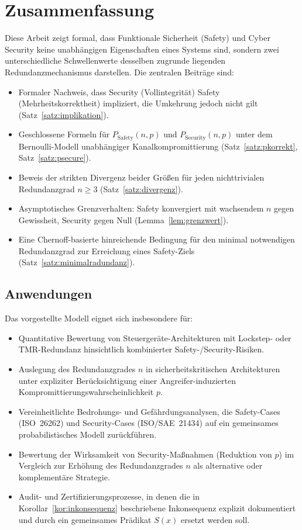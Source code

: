 ﻿\documentclass[a4paper,12pt]{article}
\theoremstyle{definition}
\begin{document}
\section{Zusammenfassung}

Diese Arbeit zeigt formal, dass Funktionale Sicherheit (Safety) und Cyber Security keine unabhängigen Eigenschaften eines Systems sind, sondern zwei unterschiedliche Schwellenwerte desselben zugrunde liegenden Redundanzmechanismus darstellen. Die zentralen Beiträge sind:

\begin{itemize}
	\item Formaler Nachweis, dass Security (Vollintegrität) Safety (Mehrheitskorrektheit) impliziert, die Umkehrung jedoch nicht gilt (Satz~\ref{satz:implikation}).
	\item Geschlossene Formeln für $P_{\mathrm{Safety}}(n,p)$ und $P_{\mathrm{Security}}(n,p)$ unter dem Bernoulli-Modell unabhängiger Kanalkompromittierung (Satz~\ref{satz:pkorrekt}, Satz~\ref{satz:psecure}).
	\item Beweis der strikten Divergenz beider Größen für jeden nichttrivialen Redundanzgrad $n \geq 3$ (Satz~\ref{satz:divergenz}).
	\item Asymptotisches Grenzverhalten: Safety konvergiert mit wachsendem $n$ gegen Gewissheit, Security gegen Null (Lemma~\ref{lem:grenzwert}).
	\item Eine Chernoff-basierte hinreichende Bedingung für den minimal notwendigen Redundanzgrad zur Erreichung eines Safety-Ziels (Satz~\ref{satz:minimalradundanz}).
\end{itemize}

\subsection{Anwendungen}

Das vorgestellte Modell eignet sich insbesondere für:
\begin{itemize}
	\item Quantitative Bewertung von Steuergeräte-Architekturen mit Lockstep- oder TMR-Redundanz hinsichtlich kombinierter Safety-/Security-Risiken.
	\item Auslegung des Redundanzgrades $n$ in sicherheitskritischen Architekturen unter expliziter Berücksichtigung einer Angreifer-induzierten Kompromittierungswahrscheinlichkeit $p$.
	\item Vereinheitlichte Bedrohungs- und Gefährdungsanalysen, die Safety-Cases (ISO~26262) und Security-Cases (ISO/SAE~21434) auf ein gemeinsames probabilistisches Modell zurückführen.
	\item Bewertung der Wirksamkeit von Security-Maßnahmen (Reduktion von $p$) im Vergleich zur Erhöhung des Redundanzgrades $n$ als alternative oder komplementäre Strategie.
	\item Audit- und Zertifizierungsprozesse, in denen die in Korollar~\ref{kor:inkonsequenz} beschriebene Inkonsequenz explizit dokumentiert und durch ein gemeinsames Prädikat $S(x)$ ersetzt werden soll.
\end{itemize}
\end{document}
